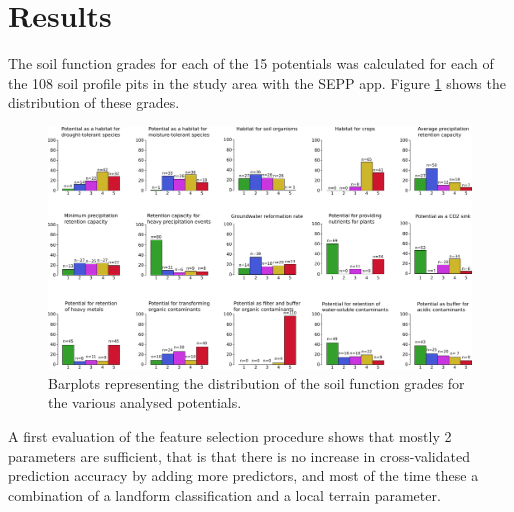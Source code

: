 \documentclass[preprint,12pt,authoryear]{elsarticle}
\begin{document}
\section{Results}
The soil function grades for each of the 15 potentials was calculated for each of the 108 soil profile pits in the study area with the SEPP app. Figure \ref{fig:SFdistro} shows the distribution of these grades.
 \begin{figure}[ht!]
\includegraphics[width=\textwidth,angle=0]{soilfunctiondistro.pdf}
\caption{Barplots representing the distribution of the soil function grades for the various analysed potentials. }
\label{fig:SFdistro}
\end{figure}
A first evaluation of the feature selection procedure shows that mostly 2 parameters are sufficient, that is that there is no increase in cross-validated prediction accuracy  by adding more predictors, and most of the time these a combination of a landform classification and a local terrain parameter.
\end{document}
